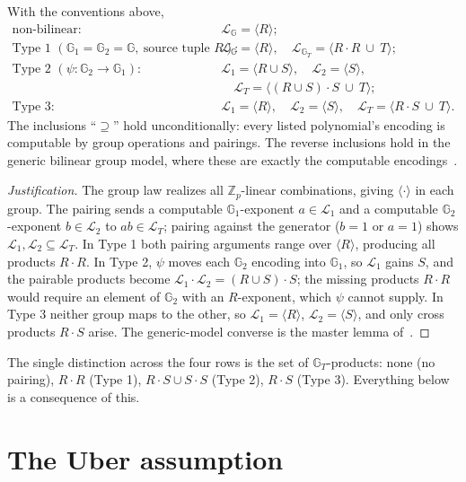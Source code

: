 \documentclass{conjura-solution}
\newcommand{\G}{\mathbb{G}}
\newcommand{\Gone}{\mathbb{G}_1}
\newcommand{\Gtwo}{\mathbb{G}_2}
\newcommand{\GT}{\mathbb{G}_T}
\newcommand{\Zp}{\mathbb{Z}_p}
\newcommand{\LL}{\mathcal{L}}
\newcommand{\Span}[1]{\langle #1 \rangle} %
\begin{document}
\begin{lemma}
\label{lem:comp}
With the conventions above,
\[
\begin{aligned}
  \text{non-bilinear:}\quad & \LL_{\G}=\Span{R};\\[2pt]
  \text{Type 1 } (\Gone=\Gtwo=\G,\ \text{source tuple }R):\quad
      & \LL_{\G}=\Span{R},\quad \LL_{\GT}=\Span{R\cdot R\ \cup\ T};\\[2pt]
  \text{Type 2 } (\psi\colon\Gtwo\to\Gone):\quad
      & \LL_{1}=\Span{R\cup S},\quad \LL_{2}=\Span{S},\\
      &\quad \LL_{T}=\Span{(R\cup S)\cdot S\ \cup\ T};\\[2pt]
  \text{Type 3:}\quad
      & \LL_{1}=\Span{R},\quad \LL_{2}=\Span{S},\quad
        \LL_{T}=\Span{R\cdot S\ \cup\ T}.
\end{aligned}
\]
The inclusions ``$\supseteq$'' hold unconditionally: every listed polynomial's encoding is
computable by group operations and pairings. The reverse inclusions hold in the generic
bilinear group model, where these are exactly the computable encodings~\cite{BBG05,Boyen08}.
\end{lemma}

\begin{proof}[Justification]
The group law realizes all $\Zp$-linear combinations, giving $\Span{\cdot}$ in each group.
The pairing sends a computable $\Gone$-exponent $a\in\LL_1$ and a computable
$\Gtwo$-exponent $b\in\LL_2$ to $ab\in\LL_T$; pairing against the generator ($b=1$ or
$a=1$) shows $\LL_1,\LL_2\subseteq\LL_T$. In Type 1 both pairing arguments range over
$\Span{R}$, producing all products $R\cdot R$. In Type 2, $\psi$ moves each $\Gtwo$
encoding into $\Gone$, so $\LL_1$ gains $S$, and the pairable products become
$\LL_1\cdot\LL_2=(R\cup S)\cdot S$; the missing products $R\cdot R$ would require an
element of $\Gtwo$ with an $R$-exponent, which $\psi$ cannot supply. In Type 3 neither
group maps to the other, so $\LL_1=\Span{R}$, $\LL_2=\Span{S}$, and only cross products
$R\cdot S$ arise. The generic-model converse is the master lemma
of~\cite{BBG05,Boyen08}.
\end{proof}

The single distinction across the four rows is the set of $\GT$-products: none (no pairing),
$R\cdot R$ (Type 1), $R\cdot S\cup S\cdot S$ (Type 2), $R\cdot S$ (Type 3). Everything below
is a consequence of this.

\section{The Uber assumption}
\end{document}
